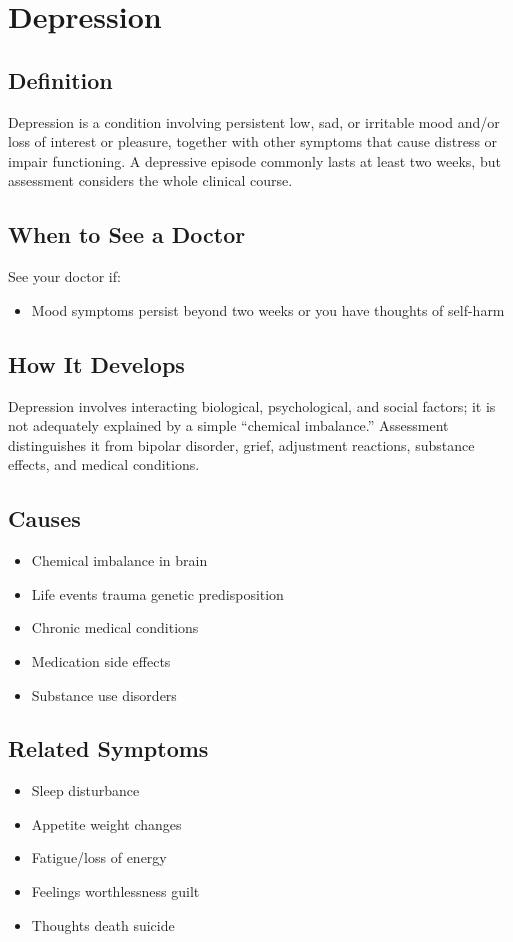 \chapter{Depression}

\section*{Definition}
Depression is a condition involving persistent low, sad, or irritable mood and/or loss of interest or pleasure, together with other symptoms that cause distress or impair functioning. A depressive episode commonly lasts at least two weeks, but assessment considers the whole clinical course.

\section*{When to See a Doctor}
See your doctor if:
\begin{itemize}
  \item Mood symptoms persist beyond two weeks or you have thoughts of self-harm
\end{itemize}

\section*{How It Develops}
Depression involves interacting biological, psychological, and social factors; it is not adequately explained by a simple “chemical imbalance.” Assessment distinguishes it from bipolar disorder, grief, adjustment reactions, substance effects, and medical conditions.

\section*{Causes}
\begin{itemize}
  \item Chemical imbalance in brain
  \item Life events trauma genetic predisposition
  \item Chronic medical conditions
  \item Medication side effects
  \item Substance use disorders
\end{itemize}

\section*{Related Symptoms}
\begin{itemize}
  \item Sleep disturbance
  \item Appetite weight changes
  \item Fatigue/loss of energy
  \item Feelings worthlessness guilt
  \item Thoughts death suicide
\end{itemize}


